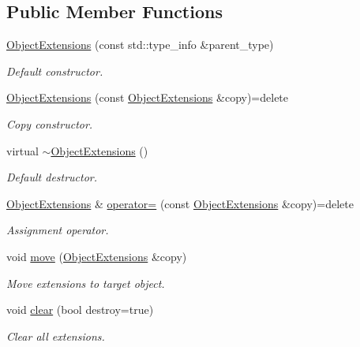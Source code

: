\subsection*{Public Member Functions}
\begin{DoxyCompactItemize}
\item 
\hyperlink{class_d_d4hep_1_1_object_extensions_adb8a89136b702583d0fa502218592696}{Object\+Extensions} (const std\+::type\+\_\+info \&parent\+\_\+type)
\begin{DoxyCompactList}\small\item\em Default constructor. \end{DoxyCompactList}\item 
\hyperlink{class_d_d4hep_1_1_object_extensions_a886c0dbb21356036ebf0198e27950572}{Object\+Extensions} (const \hyperlink{class_d_d4hep_1_1_object_extensions}{Object\+Extensions} \&copy)=delete
\begin{DoxyCompactList}\small\item\em Copy constructor. \end{DoxyCompactList}\item 
virtual \hyperlink{class_d_d4hep_1_1_object_extensions_a95f9b15025fc24b02bbda235ed888f4d}{$\sim$\+Object\+Extensions} ()
\begin{DoxyCompactList}\small\item\em Default destructor. \end{DoxyCompactList}\item 
\hyperlink{class_d_d4hep_1_1_object_extensions}{Object\+Extensions} \& \hyperlink{class_d_d4hep_1_1_object_extensions_adb53247f17183725f3fe2c5efd578d0d}{operator=} (const \hyperlink{class_d_d4hep_1_1_object_extensions}{Object\+Extensions} \&copy)=delete
\begin{DoxyCompactList}\small\item\em Assignment operator. \end{DoxyCompactList}\item 
void \hyperlink{class_d_d4hep_1_1_object_extensions_ab7062b99ac80518aa1b70da47a5d001a}{move} (\hyperlink{class_d_d4hep_1_1_object_extensions}{Object\+Extensions} \&copy)
\begin{DoxyCompactList}\small\item\em Move extensions to target object. \end{DoxyCompactList}\item 
void \hyperlink{class_d_d4hep_1_1_object_extensions_a8f55762fa8f1701f8fda19a25b027168}{clear} (bool destroy=true)
\begin{DoxyCompactList}\small\item\em Clear all extensions. \end{DoxyCompactList}\item 

\end{DoxyCompactItemize}
